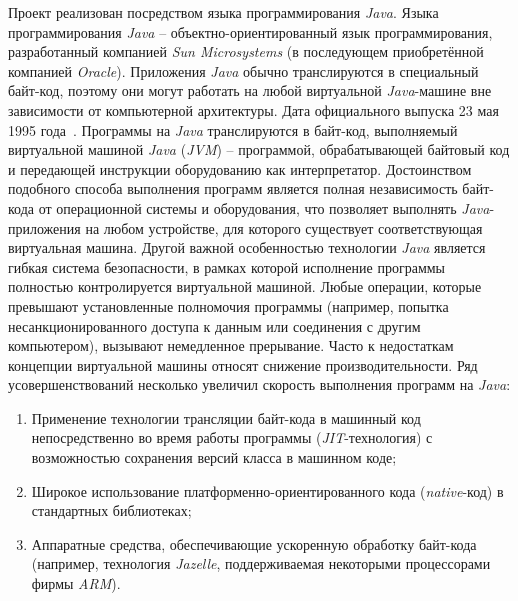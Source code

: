 Проект реализован посредством языка программирования \textit{Java}. Языка программирования \textit{Java} -- объектно-ориентированный язык программирования, разработанный компанией \textit{Sun Microsystems} (в последующем приобретённой компанией \textit{Oracle}). Приложения \textit{Java} обычно транслируются в специальный байт-код, поэтому они могут работать на любой виртуальной \textit{Java}-машине вне зависимости от компьютерной архитектуры. Дата официального выпуска 23 мая 1995 года~\cite{java}.
Программы на \textit{Java} транслируются в байт-код, выполняемый виртуальной машиной \textit{Java} (\textit{JVM}) – программой, обрабатывающей байтовый код и передающей инструкции оборудованию как интерпретатор.
Достоинством подобного способа выполнения программ является полная независимость байт-кода от операционной системы и оборудования, что позволяет выполнять \textit{Java}-приложения на любом устройстве, для которого существует соответствующая виртуальная машина. Другой важной особенностью технологии \textit{Java} является гибкая система безопасности, в рамках которой исполнение программы полностью контролируется виртуальной машиной. Любые операции, которые превышают установленные полномочия программы (например, попытка несанкционированного доступа к данным или соединения с другим компьютером), вызывают немедленное прерывание.
Часто к недостаткам концепции виртуальной машины относят снижение производительности. Ряд усовершенствований несколько увеличил скорость выполнения программ на \textit{Java}:

\begin{enumerate}
	\item Применение технологии трансляции байт-кода в машинный код непосредственно во время работы программы (\textit{JIT}-технология) с возможностью сохранения версий класса в машинном коде;
	\item Широкое использование платформенно-ориентированного кода (\textit{native}-код) в стандартных библиотеках;
	\item Аппаратные средства, обеспечивающие ускоренную обработку байт-кода (например, технология \textit{Jazelle}, поддерживаемая некоторыми процессорами фирмы \textit{ARM}).
\end{enumerate}

